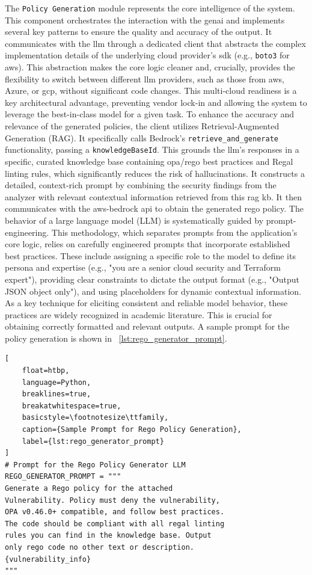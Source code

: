 The \texttt{Policy Generation} module represents the core intelligence of the system. This component orchestrates the interaction with the \gls{genai} and implements several key patterns to ensure the quality and accuracy of the output. It communicates with the \gls{llm} through a dedicated client that abstracts the complex implementation details of the underlying cloud provider's \gls{sdk} (e.g., \texttt{\gls{boto3}} for \gls{aws}). This abstraction makes the core logic cleaner and, crucially, provides the flexibility to switch between different \gls{llm} providers, such as those from \gls{aws}, Azure, or \gls{gcp}, without significant code changes. This \gls{multi-cloud} readiness is a key architectural advantage, preventing vendor lock-in and allowing the system to leverage the best-in-class model for a given task.
To enhance the accuracy and relevance of the generated policies, the client utilizes Retrieval-Augmented Generation (RAG). It specifically calls Bedrock's \texttt{retrieve\_and\_generate} functionality, passing a \texttt{knowledgeBaseId}. This grounds the \gls{llm}'s responses in a specific, curated knowledge base containing \gls{opa}/\gls{rego} best practices and Regal linting rules, which significantly reduces the risk of hallucinations. It constructs a detailed, context-rich prompt by combining the security findings from the analyzer with relevant contextual information retrieved from this \gls{rag} \gls{kb}. It then communicates with the \gls{aws-bedrock} \gls{api} to obtain the generated \gls{rego} policy.
The behavior of a large language model (LLM) is systematically guided by \gls{prompt-engineering}. This methodology, which separates prompts from the application's core logic, relies on carefully engineered prompts that incorporate established best practices. These include assigning a specific role to the model to define its persona and expertise (e.g., "you are a senior cloud security and Terraform expert"), providing clear constraints to dictate the output format (e.g., "Output JSON object only"), and using placeholders for dynamic contextual information. As a key technique for eliciting consistent and reliable model behavior, these practices are widely recognized in academic literature\cite{sahoo_systematic_2024}. This is crucial for obtaining correctly formatted and relevant outputs. A sample prompt for the policy generation is shown in ~\ref{lst:rego_generator_prompt}.
\begin{lstlisting}[
    float=htbp,
    language=Python, 
    breaklines=true, 
    breakatwhitespace=true,
    basicstyle=\footnotesize\ttfamily,
    caption={Sample Prompt for Rego Policy Generation},
    label={lst:rego_generator_prompt}
]
# Prompt for the Rego Policy Generator LLM
REGO_GENERATOR_PROMPT = """
Generate a Rego policy for the attached 
Vulnerability. Policy must deny the vulnerability, 
OPA v0.46.0+ compatible, and follow best practices. 
The code should be compliant with all regal linting 
rules you can find in the knowledge base. Output 
only rego code no other text or description.
{vulnerability_info}
"""
\end{lstlisting}

